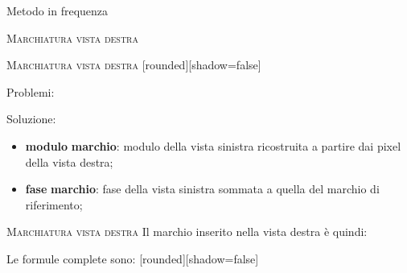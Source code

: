 \documentclass{beamer}
\begin{document}
\begin{section}{Metodo in frequenza}
\begin{frame}[t]{\textsc{Marchiatura vista destra}}
\end{frame}

\begin{frame}[t]{\textsc{Marchiatura vista destra}}
[rounded][shadow=false]
\begin{block}{Problemi:}
\end{block}
\begin{block}{Soluzione:}
		\begin{itemize}
		\item \textbf{modulo} \textbf{marchio}: modulo della vista sinistra ricostruita a partire dai pixel della vista destra;
		\item \textbf{fase} \textbf{marchio}: fase della vista sinistra sommata a quella del marchio di riferimento; 
		\end{itemize}
\end{block}

\end{frame}


\begin{frame}[t]{\textsc{Marchiatura vista destra}}
\vspace{5mm}
Il marchio inserito nella vista destra \`{e} quindi:
\begin{center}
\end{center}
\vspace{3mm}
Le formule complete sono:
\vspace{3mm}
[rounded][shadow=false]
\begin{block}{}
\begin{center}
\end{center}
\end{block}
\end{frame}
\end{section}
\end{document}
